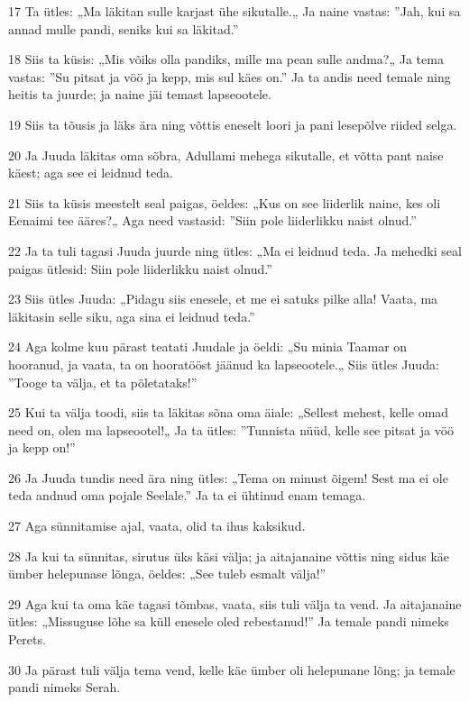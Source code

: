 \par 17 Ta ütles: „Ma läkitan sulle karjast ühe sikutalle.„ Ja naine vastas: ”Jah, kui sa annad mulle pandi, seniks kui sa läkitad.”
\par 18 Siis ta küsis: „Mis võiks olla pandiks, mille ma pean sulle andma?„ Ja tema vastas: ”Su pitsat ja vöö ja kepp, mis sul käes on.” Ja ta andis need temale ning heitis ta juurde; ja naine jäi temast lapseootele.
\par 19 Siis ta tõusis ja läks ära ning võttis eneselt loori ja pani lesepõlve riided selga.
\par 20 Ja Juuda läkitas oma sõbra, Adullami mehega sikutalle, et võtta pant naise käest; aga see ei leidnud teda.
\par 21 Siis ta küsis meestelt seal paigas, öeldes: „Kus on see liiderlik naine, kes oli Eenaimi tee ääres?„ Aga need vastasid: ”Siin pole liiderlikku naist olnud.”
\par 22 Ja ta tuli tagasi Juuda juurde ning ütles: „Ma ei leidnud teda. Ja mehedki seal paigas ütlesid: Siin pole liiderlikku naist olnud.”
\par 23 Siis ütles Juuda: „Pidagu siis enesele, et me ei satuks pilke alla! Vaata, ma läkitasin selle siku, aga sina ei leidnud teda.”
\par 24 Aga kolme kuu pärast teatati Juudale ja öeldi: „Su minia Taamar on hooranud, ja vaata, ta on hooratööst jäänud ka lapseootele.„ Siis ütles Juuda: ”Tooge ta välja, et ta põletataks!”
\par 25 Kui ta välja toodi, siis ta läkitas sõna oma äiale: „Sellest mehest, kelle omad need on, olen ma lapseootel!„ Ja ta ütles: ”Tunnista nüüd, kelle see pitsat ja vöö ja kepp on!”
\par 26 Ja Juuda tundis need ära ning ütles: „Tema on minust õigem! Sest ma ei ole teda andnud oma pojale Seelale.” Ja ta ei ühtinud enam temaga.
\par 27 Aga sünnitamise ajal, vaata, olid ta ihus kaksikud.
\par 28 Ja kui ta sünnitas, sirutus üks käsi välja; ja aitajanaine võttis ning sidus käe ümber helepunase lõnga, öeldes: „See tuleb esmalt välja!”
\par 29 Aga kui ta oma käe tagasi tõmbas, vaata, siis tuli välja ta vend. Ja aitajanaine ütles: „Missuguse lõhe sa küll enesele oled rebestanud!” Ja temale pandi nimeks Perets.
\par 30 Ja pärast tuli välja tema vend, kelle käe ümber oli helepunane lõng; ja temale pandi nimeks Serah.


